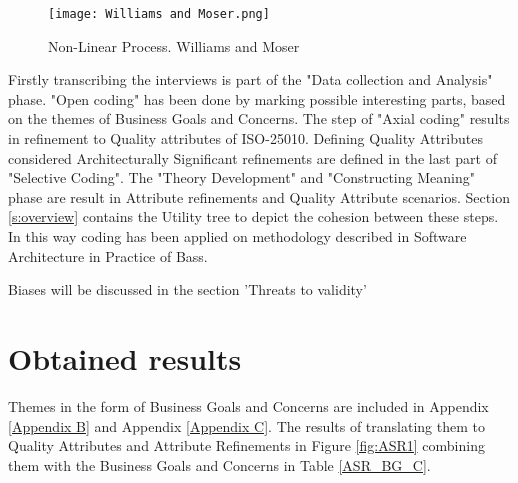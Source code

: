     \begin{figure}
        \graphicspath{ {./images/} }
        \centering
        \texttt{[image: Williams and Moser.png]}\\
        \caption{Non-Linear Process. Williams and Moser \cite{Williams2019TheAO}}
        \label{fig:WM2019}
    \end{figure}

Firstly transcribing the interviews is part of the "Data collection and Analysis" phase. "Open coding" has been done by marking possible interesting parts, based on the themes of Business Goals and Concerns. The step of "Axial coding" results in refinement to Quality attributes of ISO-25010. Defining Quality Attributes considered Architecturally Significant refinements are defined in the last part of "Selective Coding". The "Theory Development" and "Constructing Meaning" phase are result in Attribute refinements and Quality Attribute scenarios. Section \ref{s:overview} contains the Utility tree to depict the cohesion between these steps. In this way coding has been applied on methodology described in Software Architecture in Practice of Bass\etal \cite{Bass2015SoftwareAI}.

Biases will be discussed in the section 'Threats to validity'

\section{Obtained results}
Themes in the form of Business Goals and Concerns are included in Appendix \ref{Appendix B} and Appendix \ref{Appendix C}. The results of translating them to Quality Attributes and Attribute Refinements in Figure \ref{fig:ASR1} combining them with the Business Goals and Concerns in Table \ref{ASR_BG_C}.




